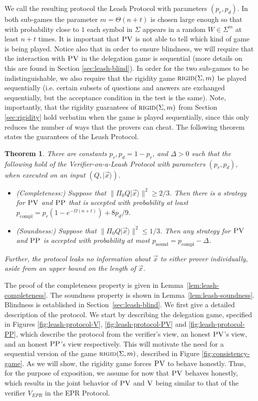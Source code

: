 \documentclass[11pt]{article}
\newtheorem{theorem}{Theorem}
\theoremstyle{remark}
\theoremstyle{definition}
\newcommand{\ket}[1]{|#1\rangle}
\newcommand{\rigid}{\textsc{rigid}}
\newcommand{\ver}{\textsc{V}}
\newcommand{\pv}{\textsc{PV}}
\newcommand{\pp}{\textsc{PP}}
\begin{document}
We call the resulting protocol the Leash Protocol with parameters $(p_r,p_d)$. In both sub-games the parameter $m=\Theta(n+t)$ is chosen large enough so that with probability close to $1$ each symbol in $\Sigma$ appears in a random $W\in \Sigma^m$ at least $n+t$ times. It is important that $\pv$ is not able to tell which kind of game is being played. Notice also that in order to ensure blindness, we will require that the interaction with $\pv$ in the delegation game is sequential (more details on this are found in Section \ref{sec:leash-blind}). In order for the two sub-games to be indistinguishable, we also require that the rigidity game $\rigid(\Sigma,m)$ be played sequentially (i.e. certain subsets of questions and answers are exchanged sequentially, but the acceptance condition in the test is the same). Note, importantly, that the rigidity guarantees of $\rigid(\Sigma,m)$ from Section \ref{sec:rigidity} hold verbatim when the game is played sequentially, since this only reduces the number of ways that the provers can cheat. The following theorem states the guarantees of the Leash Protocol.

\begin{theorem}\label{thm:leash}
There are constants $p_r,p_d=1-p_r$, and $\Delta>0$ such that the following hold of the Verifier-on-a-Leash Protocol with parameters $(p_r,p_d)$, when executed on an input $(Q,\ket{\vec{x}})$.
\begin{itemize}
\item \emph{(Completeness:)} Suppose that $\|\Pi_0 Q\ket{\vec{x}}\|^2 \geq 2/3$. Then there is a strategy for $\pv$ and $\pp$ that is accepted with probability at least $p_{\mathrm{compl}} = p_r(1-e^{-\Omega(n+t)})+8p_d/9$. 
\item \emph{(Soundness:)} Suppose that $\|\Pi_0 Q\ket{\vec{x}}\|^2 \leq 1/3$. Then any strategy for $\pv$ and $\pp$ is accepted with probability at most $p_{\mathrm{sound}} = p_{\mathrm{compl}} - \Delta$. 
\end{itemize}
Further, the protocol leaks no information about $\vec{x}$ to either prover individually, aside from an upper bound on the length of $\vec{x}$. 
\end{theorem}



The proof of the completeness property is given in Lemma~\ref{lem:leash-completeness}. The soundness property is shown in Lemma~\ref{lem:leash-soundness}. Blindness is established in Section~\ref{sec:leash-blind}. 
We first give a detailed description of the protocol. We start by describing the delegation game, specified in Figures \ref{fig:leash-protocol-V}, \ref{fig:leash-protocol-PV} and \ref{fig:leash-protocol-PP}, which describe the protocol from the verifier's view, an honest $\pv$'s view, and an honest $\pp$'s view respectively. This will motivate the need for a sequential version of the game $\rigid(\Sigma,m)$, described in Figure \ref{fig:consistency-game}. As we will show, the rigidity game forces $\pv$ to behave honestly. Thus, for the purpose of exposition, we assume for now that $\pv$ behaves honestly, which results in the joint behavior of $\pv$ and $\ver$ being similar to that of the verifier $V_{EPR}$ in the EPR Protocol. 
\end{document}
